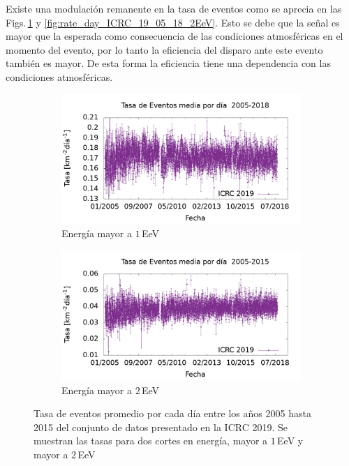 				Existe una modulación remanente en la tasa de eventos como se aprecia en las Figs.\,\ref{fig:rate_day_ICRC_19_05_18} y \ref{fig:rate_day_ICRC_19_05_18_2EeV}. Esto se debe que la señal es mayor que la esperada como consecuencia de las condiciones atmosféricas en el momento del evento, por lo tanto la eficiencia del disparo ante este evento también es mayor. De esta forma la eficiencia tiene una dependencia con las condiciones atmosféricas.
			\begin{figure}[H]
    			\begin{subfigure}[b]{0.5\textwidth}
				\includegraphics[width=\textwidth]{../clima/Graphs/rate_dayly/1EeV_ICRC_2019_05_18.png}
				\caption{Energía mayor a $1\,$EeV}
				\label{fig:rate_day_ICRC_19_05_18}
    			\end{subfigure}%
    			\hspace{\fill}
    			\begin{subfigure}[b]{0.5\textwidth}
				\includegraphics[width=\textwidth]{../clima/Graphs/rate_dayly/2EeV_ICRC_2019_05_19.png}
				\caption{ Energía mayor a $2\,$EeV}
				\label{fig:rate_2015_ICRC_19_05_18}
    			\end{subfigure}%
    			\caption{Tasa de eventos promedio por cada día entre los años 2005 hasta 2015 del conjunto de datos presentado en la ICRC 2019. Se muestran las tasas para dos cortes en energía, mayor a $1\,$EeV y mayor a $2\,$EeV}\label{fig:rate_new_18}
			\end{figure}
